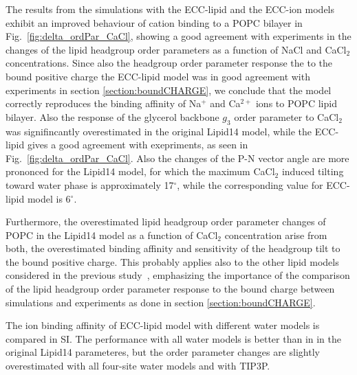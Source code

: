 \documentclass[aip,jcp,twocolumn]{revtex4}
\begin{document}
The results from the simulations with the ECC-lipid and the ECC-ion models \cite{jungwirth17-new-paper-to-be-published, kohagen16, Pluharova2014}
exhibit an improved behaviour of cation binding to a POPC bilayer in Fig.~\ref{fig:delta_ordPar_CaCl},
showing a good agreement with experiments in the changes of 
the lipid headgroup order parameters as a function of NaCl and CaCl$_2$ concentrations.
Since also the headgroup order parameter
response the to the bound positive charge the ECC-lipid model
was in good agreement with experiments in section \ref{section:boundCHARGE},
we conclude that the model correctly reproduces the binding affinity of
Na$^{+}$ and Ca$^{2+}$ ions to POPC lipid bilayer.
Also the response of the glycerol backbone $g_3$ order parameter to CaCl$_2$ was
signifincantly overestimated in the original Lipid14 model, while the ECC-lipid
gives a good agreement with exepriments, as seen in Fig.~\ref{fig:delta_ordPar_CaCl}.
Also the changes of the P-N vector angle are more prononced
for the Lipid14 model, for which the maximum CaCl$_2$ induced tilting 
toward water phase is approximately 17$^{\circ}$, while the corresponding
value for ECC-lipid model is 6$^{\circ}$.

Furthermore, the overestimated lipid headgroup order parameter changes of POPC in the Lipid14
model as a function of CaCl$_2$ concentration arise from both, the overestimated
binding affinity and sensitivity of the headgroup tilt to the bound positive charge.
This probably applies also to the other lipid models considered in the previous study~\cite{catte16},
emphasizing the importance of the comparison of the lipid headgroup order parameter response
to the bound charge between simulations and experiments as done in section \ref{section:boundCHARGE}.

The ion binding affinity of ECC-lipid model with different water models is compared
in SI. The performance with all water models is better than in in the original Lipid14
parameteres, but the order parameter changes are slightly overestimated
with all four-site water models and with TIP3P.


\end{document}

